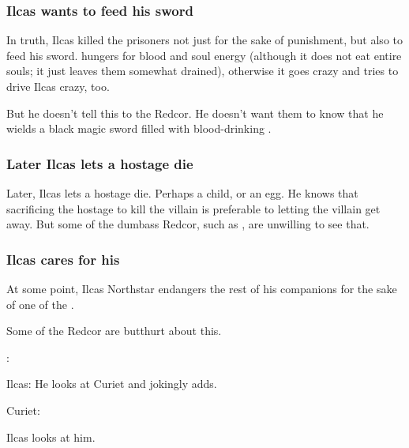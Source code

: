 \subsubsection{Ilcas wants to feed his sword}
In truth, Ilcas killed the prisoners not just for the sake of punishment, but also to feed his sword. 
\Telderain{} hungers for blood and soul energy (although it does not eat entire souls; it just leaves them somewhat drained), otherwise it goes crazy and tries to drive Ilcas crazy, too.  

But he doesn't tell this to the Redcor. 
He doesn't want them to know that he wields a black magic sword filled with blood-drinking \daemons. 





\subsubsection{Later Ilcas lets a hostage die}
Later, Ilcas lets a hostage die. 
Perhaps a child, or an egg. 
He knows that sacrificing the hostage to kill the villain is preferable to letting the villain get away. 
But some of the dumbass Redcor, such as \Racel, are unwilling to see that. 





\subsubsection{Ilcas cares for his \nycans}
At some point, Ilcas Northstar endangers the rest of his companions for the sake of one of the \nycans. 

Some of the Redcor are butthurt about this.

\begin{prose}
  \Esmerel: 
  
  Ilcas: 
  He looks at Curiet and jokingly adds.
  
  Curiet:
  
  Ilcas looks at him.
\end{prose}









